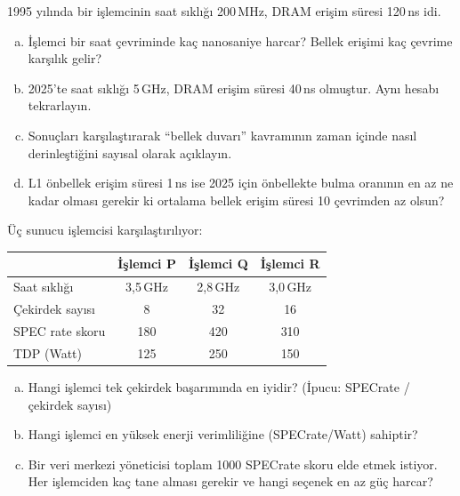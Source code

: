 \begin{alistirma}[\orta]
1995 yılında bir işlemcinin saat sıklığı 200\,MHz, DRAM erişim süresi 120\,ns idi.
\begin{enumerate}[(a)]
    \item İşlemci bir saat çevriminde kaç nanosaniye harcar? Bellek erişimi kaç çevrime karşılık gelir?
    \item 2025'te saat sıklığı 5\,GHz, DRAM erişim süresi 40\,ns olmuştur. Aynı hesabı tekrarlayın.
    \item Sonuçları karşılaştırarak ``bellek duvarı'' kavramının zaman içinde nasıl derinleştiğini sayısal olarak açıklayın.
    \item L1 önbellek erişim süresi 1\,ns ise 2025 için önbellekte bulma oranının en az ne kadar olması gerekir ki ortalama bellek erişim süresi 10 çevrimden az olsun?
\end{enumerate}
\end{alistirma}

\begin{alistirma}[\zor]
Üç sunucu işlemcisi karşılaştırılıyor:

\begin{center}
\small
\begin{tabular}{lccc}
\toprule
& \textbf{İşlemci P} & \textbf{İşlemci Q} & \textbf{İşlemci R} \\
\midrule
Saat sıklığı & 3,5\,GHz & 2,8\,GHz & 3,0\,GHz \\
Çekirdek sayısı & 8 & 32 & 16 \\
SPEC rate skoru & 180 & 420 & 310 \\
TDP (Watt) & 125 & 250 & 150 \\
\bottomrule
\end{tabular}
\end{center}

\begin{enumerate}[(a)]
    \item Hangi işlemci tek çekirdek başarımında en iyidir? (İpucu: SPECrate / çekirdek sayısı)
    \item Hangi işlemci en yüksek enerji verimliliğine (SPECrate/Watt) sahiptir?
    \item Bir veri merkezi yöneticisi toplam 1000 SPECrate skoru elde etmek istiyor. Her işlemciden kaç tane alması gerekir ve hangi seçenek en az güç harcar?
\end{enumerate}
\end{alistirma}

